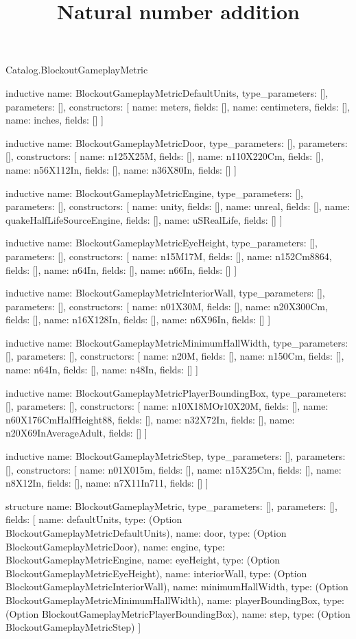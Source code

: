 \begin{lexlean}{Catalog.BlockoutGameplayMetric}
\title{Natural number addition}
\begin{semanticmodule}
inductive{
  name: BlockoutGameplayMetricDefaultUnits,
  type_parameters: [],
  parameters: [],
  constructors: [
    {name: meters, fields: []},
    {name: centimeters, fields: []},
    {name: inches, fields: []}
  ]
}

inductive{
  name: BlockoutGameplayMetricDoor,
  type_parameters: [],
  parameters: [],
  constructors: [
    {name: n125X25M, fields: []},
    {name: n110X220Cm, fields: []},
    {name: n56X112In, fields: []},
    {name: n36X80In, fields: []}
  ]
}

inductive{
  name: BlockoutGameplayMetricEngine,
  type_parameters: [],
  parameters: [],
  constructors: [
    {name: unity, fields: []},
    {name: unreal, fields: []},
    {name: quakeHalfLifeSourceEngine, fields: []},
    {name: uSRealLife, fields: []}
  ]
}

inductive{
  name: BlockoutGameplayMetricEyeHeight,
  type_parameters: [],
  parameters: [],
  constructors: [
    {name: n15M17M, fields: []},
    {name: n152Cm8864, fields: []},
    {name: n64In, fields: []},
    {name: n66In, fields: []}
  ]
}

inductive{
  name: BlockoutGameplayMetricInteriorWall,
  type_parameters: [],
  parameters: [],
  constructors: [
    {name: n01X30M, fields: []},
    {name: n20X300Cm, fields: []},
    {name: n16X128In, fields: []},
    {name: n6X96In, fields: []}
  ]
}

inductive{
  name: BlockoutGameplayMetricMinimumHallWidth,
  type_parameters: [],
  parameters: [],
  constructors: [
    {name: n20M, fields: []},
    {name: n150Cm, fields: []},
    {name: n64In, fields: []},
    {name: n48In, fields: []}
  ]
}

inductive{
  name: BlockoutGameplayMetricPlayerBoundingBox,
  type_parameters: [],
  parameters: [],
  constructors: [
    {name: n10X18MOr10X20M, fields: []},
    {name: n60X176CmHalfHeight88, fields: []},
    {name: n32X72In, fields: []},
    {name: n20X69InAverageAdult, fields: []}
  ]
}

inductive{
  name: BlockoutGameplayMetricStep,
  type_parameters: [],
  parameters: [],
  constructors: [
    {name: n01X015m, fields: []},
    {name: n15X25Cm, fields: []},
    {name: n8X12In, fields: []},
    {name: n7X11In711, fields: []}
  ]
}

structure{
  name: BlockoutGameplayMetric,
  type_parameters: [],
  parameters: [],
  fields: [
    {name: defaultUnits, type: (Option BlockoutGameplayMetricDefaultUnits)},
    {name: door, type: (Option BlockoutGameplayMetricDoor)},
    {name: engine, type: BlockoutGameplayMetricEngine},
    {name: eyeHeight, type: (Option BlockoutGameplayMetricEyeHeight)},
    {name: interiorWall, type: (Option BlockoutGameplayMetricInteriorWall)},
    {name: minimumHallWidth, type: (Option BlockoutGameplayMetricMinimumHallWidth)},
    {name: playerBoundingBox, type: (Option BlockoutGameplayMetricPlayerBoundingBox)},
    {name: step, type: (Option BlockoutGameplayMetricStep)}
  ]
}
\end{semanticmodule}
\end{lexlean}

